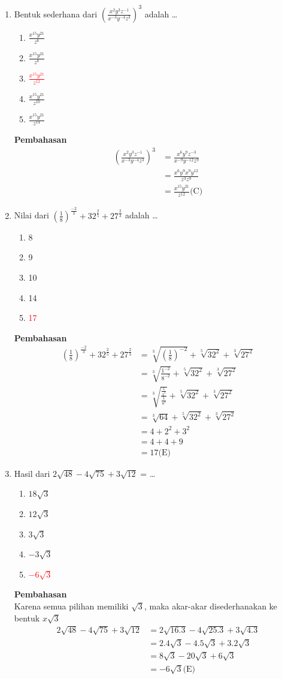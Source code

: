 \documentclass{report}
\newcommand{\options}[5]{
\begin{enumerate}[label=\alph*.]
	\item #1
	\item #2
	\item #3
	\item #4
	\item #5
\end{enumerate}
}
\newcommand{\pemb}{ \textbf{Pembahasan} \\}
\begin{document}
\begin{enumerate}
\item
Bentuk sederhana dari $\left(\frac{x^{2}y^{3}z^{-1}}{x^{-3}y^{-4}z^{3}}\right)^3$ adalah \ldots
\options
{$\frac{x^{15} y^{21}}{z^6}$}
{$\frac{x^{15} y^{21}}{z^8}$}
{\textcolor{red}{{$\frac{x^{15} y^{21}}{z^{12}}$}}}
{$\frac{x^{15} y^{21}}{z^{10}}$}
{$\frac{x^{15} y^{21}}{z^{14}}$}

\pemb

\begin{align*}
	\left(\frac{x^{2}y^{3}z^{-1}}{x^{-3}y^{-4}z^{3}}\right)^3 
	&= \frac{x^{6}y^{9}z^{-3}}{x^{-9}y^{-12}z^{9}} \\
	&= \frac{x^{6}y^{9}x^{9}y^{12}}{z^{3}z^{9}} \\
	&= \frac{x^{15} y^{21}}{z^{12}} \text{(C)}
\end{align*}
\item
Nilai dari $\left(\frac{1}{8}\right)^{\frac{-2}{3}}+32^{\frac{2}{5}}+27^{\frac{2}{3}}$ adalah \ldots
\options
{8}
{9}
{10}
{14}
{\textcolor{red}{17}}

\pemb
\begin{align*}
	\left(\frac{1}{8}\right)^{\frac{-2}{3}}+32^{\frac{2}{5}}+27^{\frac{2}{3}} 
	&= \sqrt[3]{\left(\frac{1}{8}\right)^{-2}}+\sqrt[5]{32^{2}}+\sqrt[3]{27^{2}} \\
	&= \sqrt[3]{\frac{1^{-2}}{8^{-2}}}+\sqrt[5]{32^{2}}+\sqrt[3]{27^{2}} \\
	&= \sqrt[3]{\frac{\frac{1}{1^{2}}}{\frac{1}{8^{2}}}}+\sqrt[5]{32^{2}}+\sqrt[3]{27^{2}}\\
	&= \sqrt[3]{64}+\sqrt[5]{32^{2}}+\sqrt[3]{27^{2}}\\
	&= 4 + 2^2 + 3^2 \\
	&= 4 + 4 + 9 \\
	&= 17  \text{(E)}
\end{align*}

\item
Hasil dari $2\sqrt{48}-4\sqrt{75}+3\sqrt{12}$ = \ldots
\options
{$18\sqrt{3}$}
{$12\sqrt{3}$}
{$3\sqrt{3}$}
{$-3\sqrt{3}$}
{\textcolor{red}{$-6\sqrt{3}$}}
\pemb
Karena semua pilihan memiliki $\sqrt{3}$, maka akar-akar disederhanakan ke bentuk $x\sqrt{3}$
\begin{align*}
	2\sqrt{48}-4\sqrt{75}+3\sqrt{12} 
	&= 2\sqrt{16.3}-4\sqrt{25.3}+3\sqrt{4.3} \\
	&= 2.4\sqrt{3}-4.5\sqrt{3}+3.2\sqrt{3} \\
	&= 8\sqrt{3}-20\sqrt{3}+6\sqrt{3} \\
	&= -6\sqrt{3} \text{(E)}
\end{align*}


\end{enumerate}
\end{document}
